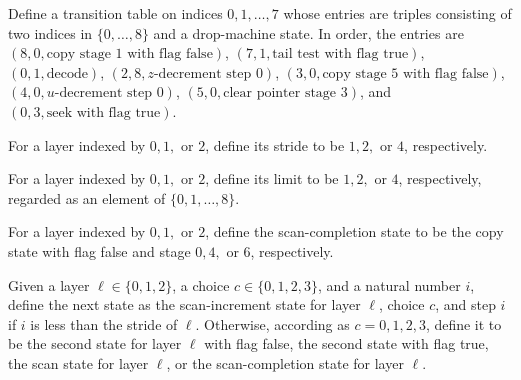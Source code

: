\begin{definition}
\label{Complexity.dropCopy}
\leanok
{}
Define a transition table on indices $0,1,\ldots,7$ whose entries are triples consisting
of two indices in $\{0,\ldots,8\}$ and a drop-machine state. In order, the entries are
$(8,0,\text{copy stage }1\text{ with flag false})$, $(7,1,\text{tail test with flag
true})$, $(0,1,\text{decode})$, $(2,8,\text{$z$-decrement step }0)$, $(3,0,\text{copy
stage }5\text{ with flag false})$, $(4,0,\text{$u$-decrement step }0)$,
$(5,0,\text{clear pointer stage }3)$, and $(0,3,\text{seek with flag true})$.
\end{definition}

\begin{definition}
\label{Complexity.dropStride}
\leanok
For a layer indexed by $0,1,$ or $2$, define its stride to be $1,2,$ or $4$,
respectively.
\end{definition}

\begin{definition}
\label{Complexity.dropLimit}
\leanok
For a layer indexed by $0,1,$ or $2$, define its limit to be $1,2,$ or $4$,
respectively, regarded as an element of $\{0,1,\ldots,8\}$.
\end{definition}

\begin{definition}
\label{Complexity.dropScanDone}
\leanok
{}
For a layer indexed by $0,1,$ or $2$, define the scan-completion state to be the copy
state with flag false and stage $0,4,$ or $6$, respectively.
\end{definition}

\begin{definition}
\label{Complexity.dropAdvance}
\leanok
{}
Given a layer $\ell\in\{0,1,2\}$, a choice $c\in\{0,1,2,3\}$, and a natural number $i$,
define the next state as the scan-increment state for layer $\ell$, choice $c$, and step
$i$ if $i$ is less than the stride of $\ell$. Otherwise, according as $c=0,1,2,3$,
define it to be the second state for layer $\ell$ with flag false, the second state with
flag true, the scan state for layer $\ell$, or the scan-completion state for layer
$\ell$.
\end{definition}

